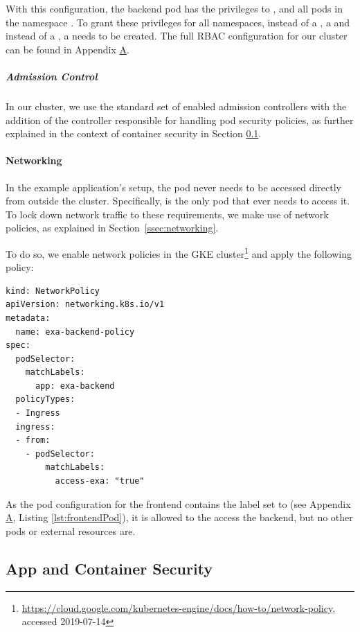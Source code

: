 With this configuration, the backend pod has the privileges to ,  and  all pods in the namespace . To grant these privileges for all namespaces, instead of a , a  and instead of a , a  needs to be created. The full \ac{RBAC} configuration for our cluster can be found in Appendix \hyperref[apx:A]{A}.

\subparagraph{Admission Control}

In our cluster, we use the standard set of enabled admission controllers with the addition of the controller responsible for handling pod security policies, as further explained in the context of container security in Section \ref{ssec:exaLayer4}.


\paragraph{Networking}

In the example application's setup, the pod  never needs to be accessed directly from outside the cluster. Specifically,  is the only pod that ever needs to access it. To lock down network traffic to these requirements, we make use of network policies, as explained in Section~\ref{ssec:networking}. 

To do so, we enable network policies in the \ac{GKE} cluster\footnote{\url{https://cloud.google.com/kubernetes-engine/docs/how-to/network-policy}, accessed 2019-07-14} and apply the following policy:

\begin{verbatim}
kind: NetworkPolicy
apiVersion: networking.k8s.io/v1
metadata:
  name: exa-backend-policy
spec:
  podSelector:
    matchLabels:
      app: exa-backend
  policyTypes:
  - Ingress
  ingress:
  - from:
    - podSelector:
        matchLabels:
          access-exa: "true"
\end{verbatim}

As the pod configuration for the frontend contains the label  set to  (see Appendix \hyperref[apx:A]{A}, Listing \ref{lst:frontendPod}), it is allowed to the access the backend, but no other pods or external resources are.

\subsection{App and Container Security} \label{ssec:exaLayer4}

